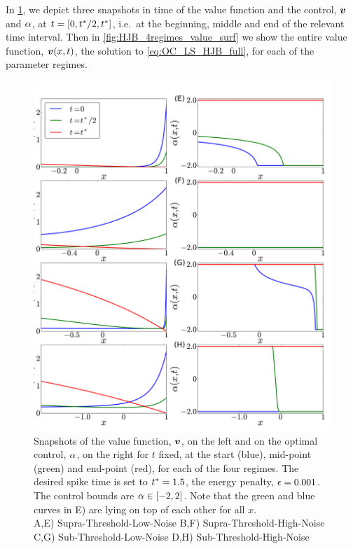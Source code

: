 \documentclass[12pt]{iopart}
\begin{document}
In \cref{fig:HJB_4regimes_value_control_cuts}, we depict three snapshots
in time of the value function and the control, ${ \boldsymbol{v} }$ and ${\alpha}$, at $t = [0,{ t^* }/2,
{ t^* }]$, i.e.\ at the beginning, middle and end of the relevant time interval. Then in
\cref{fig:HJB_4regimes_value_surf} we show the entire value function, ${ \boldsymbol{v} }(x,t)$,
the solution to \cref{eq:OC_LS_HJB_full}, for each of the parameter regimes.
\begin{figure}[htp]
\begin{center}
  \includegraphics[width=.99\textwidth]{Figs/HJB/Regimes_vc_cuts.pdf}
  \caption[labelInTOC]{Snapshots of the value function, ${ \boldsymbol{v} }$, on the left and on
  the optimal control, ${\alpha}$, on the right for $t$ fixed, at the start (blue),
  mid-point (green) and end-point (red), for each of the four regimes. The desired spike time is set to ${ t^* }=1.5$, the energy penalty, ${\epsilon}
  = 0.001$. The control bounds are ${\alpha} \in [-2,2]$. Note that the green and blue
  curves in E) are lying on top of each other for all $x$.
  \\
  A,E) Supra-Threshold-Low-Noise
  B,F) Supra-Threshold-High-Noise
  C,G) Sub-Threshold-Low-Noise
  D,H) Sub-Threshold-High-Noise
  }
\label{fig:HJB_4regimes_value_control_cuts}
\end{center}
\end{figure}
\end{document}
